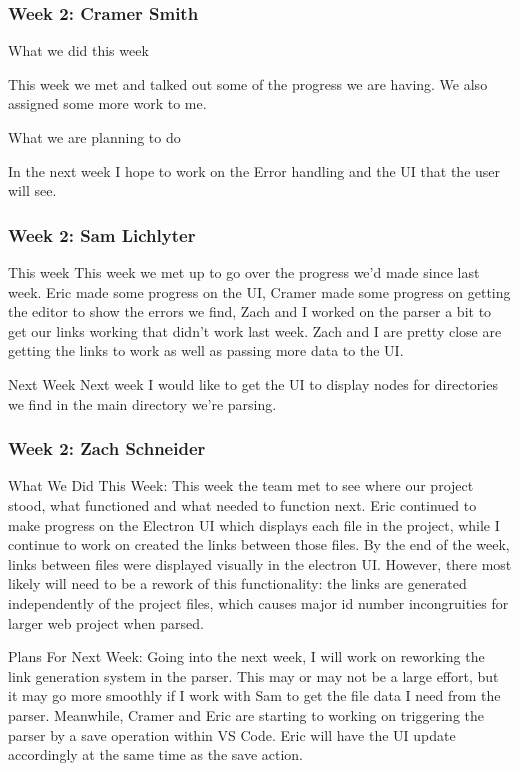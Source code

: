 \subsubsection{Week 2: Cramer Smith}

What we did this week

This week we met and talked out some of the progress we are having. We also assigned some more work to me.

What we are planning to do

In the next week I hope to work on the Error handling and the UI that the user will see.

\subsubsection{Week 2: Sam Lichlyter}

This week
This week we met up to go over the progress we'd made since last week. Eric made some progress on the UI, Cramer made some progress on getting the editor to show the errors we find, Zach and I worked on the parser a bit to get our links working that didn't work last week. Zach and I are pretty close are getting the links to work as well as passing more data to the UI.

Next Week
Next week I would like to get the UI to display nodes for directories we find in the main directory we're parsing. 

\subsubsection{Week 2: Zach Schneider}

What We Did This Week:
This week the team met to see where our project stood, what functioned and what needed to function next. Eric continued to make progress on the Electron UI which displays each file in the project, while I continue to work on created the links between those files. By the end of the week, links between files were displayed visually in the electron UI. However, there most likely will need to be a rework of this functionality: the links are generated independently of the project files, which causes major id number incongruities for larger web project when parsed.

Plans For Next Week:
Going into the next week, I will work on reworking the link generation system in the parser. This may or may not be a large effort, but it may go more smoothly if I work with Sam to get the file data I need from the parser. Meanwhile, Cramer and Eric are starting to working on triggering the parser by a save operation within VS Code. Eric will have the UI update accordingly at the same time as the save action.

